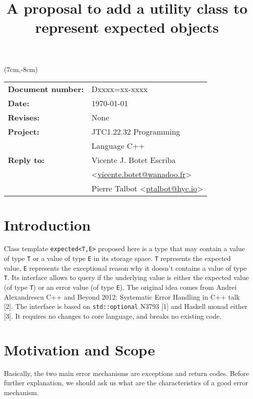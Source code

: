 \documentclass[a4paper,10pt]{article}
\title{A proposal to add a utility class to represent expected objects}
\author{}
\date{}
\newcommand{\cpp}[1]{\lstinline{#1}}
\begin{document}
\maketitle
\begin{textblock*}{9cm}(7cm,-8cm)
\begin{tabular}{l l}
\textbf{Document number:} & Dxxxx=xx-xxxx \\
\textbf{Date:}  & \today \\
\textbf{Revises:} & None \\
\textbf{Project:} & JTC1.22.32 Programming \\
 & Language C++ \\
\textbf{Reply to:} & Vicente J. Botet Escriba \\
 & <\href{mailto:vicente.botet@wanadoo.fr}{vicente.botet@wanadoo.fr}> \\
 & Pierre Talbot <\href{mailto:ptalbot@hyc.io}{ptalbot@hyc.io}>
\end{tabular}
\end{textblock*}

\vspace{-6em}
\setcounter{tocdepth}{1}
\tableofcontents

\section{Introduction}

Class template \cpp{expected<T,E>} proposed here is a type that may contain a value of type \cpp{T} or a value of type \cpp{E} in its storage space. \cpp{T} represents the expected value, \cpp{E} represents the exceptional reason why it doesn't contains a value of type \cpp{T}. Its interface allows to query if the underlying value is either the expected value (of type \cpp{T}) or an error value (of type \cpp{E}). The original idea comes from Andrei Alexandrescu C++ and Beyond 2012: Systematic Error Handling in C++ talk [2]. The interface is based on \cpp{std::optional} N3793 [1] and Haskell monad either [3]. It requires no changes to core language, and breaks no existing code.

\section{Motivation and Scope}

Basically, the two main error mechanisms are exceptions and return codes. Before further explanation, we should ask us what are the characteristics of a good error mechanism.
\end{document}
